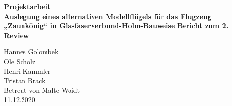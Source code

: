 \begin{center}
\begin{large}
	\noindent\textbf{Projektarbeit}\\
	\noindent\textbf{Auslegung eines alternativen Modellflügels für das Flugzeug „Zaunkönig“ in Glasfaserverbund-Holm-Bauweise}\newline
	\noindent\textbf{Bericht zum 2. Review}\\
\end{large}
Hannes Golombek\\
Ole Scholz\\
Henri Kammler\\
Tristan Brack\\
Betreut von Malte Woidt\\
11.12.2020\\
\end{center}


